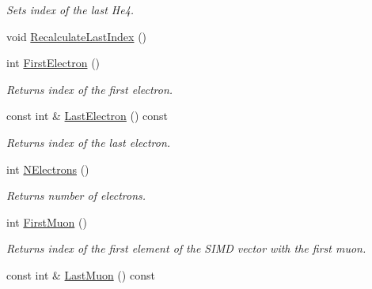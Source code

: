 \begin{DoxyCompactItemize}
\begin{DoxyCompactList}\small\item\em Sets index of the last He4. \end{DoxyCompactList}\item 
void \hyperlink{classKFPTrackVector_a75dbd6777b63099ec45dc92f5168ea08}{Recalculate\+Last\+Index} ()
\item 
int \hyperlink{classKFPTrackVector_a0a271affcd2742752e94eec987a5afd6}{First\+Electron} ()\hypertarget{classKFPTrackVector_a0a271affcd2742752e94eec987a5afd6}{}\label{classKFPTrackVector_a0a271affcd2742752e94eec987a5afd6}

\begin{DoxyCompactList}\small\item\em Returns index of the first electron. \end{DoxyCompactList}\item 
const int \& \hyperlink{classKFPTrackVector_ae6760c484733d2555c1e1f645770e326}{Last\+Electron} () const \hypertarget{classKFPTrackVector_ae6760c484733d2555c1e1f645770e326}{}\label{classKFPTrackVector_ae6760c484733d2555c1e1f645770e326}

\begin{DoxyCompactList}\small\item\em Returns index of the last electron. \end{DoxyCompactList}\item 
int \hyperlink{classKFPTrackVector_ab4185e892e693cdf3a2d80ebebbae5ff}{N\+Electrons} ()\hypertarget{classKFPTrackVector_ab4185e892e693cdf3a2d80ebebbae5ff}{}\label{classKFPTrackVector_ab4185e892e693cdf3a2d80ebebbae5ff}

\begin{DoxyCompactList}\small\item\em Returns number of electrons. \end{DoxyCompactList}\item 
int \hyperlink{classKFPTrackVector_a5888805117901064114068a6d0fb070c}{First\+Muon} ()\hypertarget{classKFPTrackVector_a5888805117901064114068a6d0fb070c}{}\label{classKFPTrackVector_a5888805117901064114068a6d0fb070c}

\begin{DoxyCompactList}\small\item\em Returns index of the first element of the S\+I\+MD vector with the first muon. \end{DoxyCompactList}\item 
const int \& \hyperlink{classKFPTrackVector_ac54e8d0edc1454f3635b1e551cb06b41}{Last\+Muon} () const \hypertarget{classKFPTrackVector_ac54e8d0edc1454f3635b1e551cb06b41}{}\label{classKFPTrackVector_ac54e8d0edc1454f3635b1e551cb06b41}


\end{DoxyCompactItemize}
